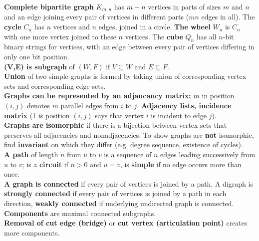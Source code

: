 \documentclass[12pt]{article}
\begin{document}
\textbf{Complete bipartite graph} $K_{m,n}$ has $m+n$ vertices in parts of sizes $m$ and $n$ and an edge joining every pair of vertices in different parts ($mn$ edges in all). The \textbf{cycle} $C_n$ has $n$ vertices and $n$ edges, joined in a circle. \textbf{The wheel} $W_n$ is $C_n$ with one more vertex joined to these $n$ vertices. The \textbf{cube} $Q_n$ has all $n$-bit binary strings for vertices, with an edge between every pair of vertices differing in only one bit position. \\
\textbf{(V,E) is subgraph} of $(W,F)$ if $V \subseteq W$ and $E \subseteq F$. \\
\textbf{Union} of two simple graphs is formed by taking union of corresponding vertex sets and corresponding edge sets. \\
\textbf{Graphs can be represented by an adjancancy matrix:} $m$ in position $(i,j)$ denotes $m$ parallel edges from $i$ to $j$. \textbf{Adjacency lists, incidence matrix} (1 is position $(i,j)$ says that vertex $i$ is incident to edge $j$). \\
\textbf{Graphs are isomorphic} if there is a bijection between vertex sets that preserves all adjacencies and nonadjacencies. To show graphs are \textbf{not} isomorphic, find \textbf{invariant} on which they differ (e.g. degree sequence, existence of cycles). \\
\textbf{A path} of length $n$ from $u$ to $v$ is a sequence of $n$ edges leading successively from $u$ to $v$; is a \textbf{circuit} if $n > 0$ and $ u = v$, is \textbf{simple} if no edge occurs more than once. \\
\textbf{A graph is connected} if every pair of vertices is joined by a path. A digraph is \textbf{strongly connected} if every pair of vertices is joined by a path in each direction, \textbf{weakly connected} if underlying undirected graph is connected. \\
\textbf{Components} are maximal connected subgraphs.\\
\textbf{Removal of cut edge (bridge)} or \textbf{cut vertex (articulation point)} creates more components.
\newpage
\end{document}
